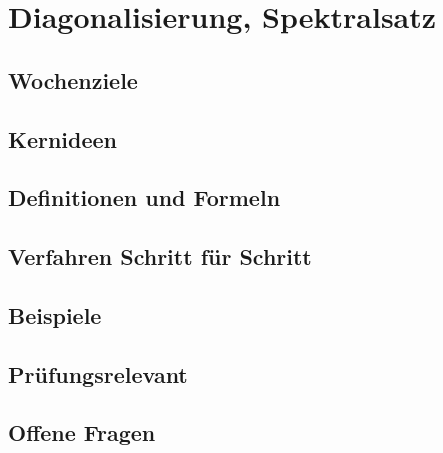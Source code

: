 \chapter{Diagonalisierung, Spektralsatz}
\label{kap:09-diagonalisierung}

\section*{Wochenziele}
\begin{wochenziele}
\end{wochenziele}

\section{Kernideen}

\section{Definitionen und Formeln}

\section{Verfahren Schritt für Schritt}

\section{Beispiele}

\section{Prüfungsrelevant}

\section{Offene Fragen}
